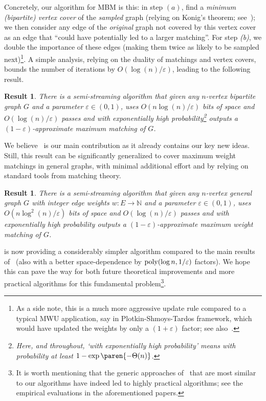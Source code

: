 \documentclass{article}
\newtheorem{result}[theorem]{Result}%
\DeclarePairedDelimiter{\paren}()
\newcommand{\eps}{\varepsilon}
\newcommand{\poly}{\mbox{\rm poly}}
\newcommand{\IN}{\mathbb{N}}
\begin{document}
Concretely, our algorithm for MBM is this: in step $(a)$, find 
a \emph{minimum (bipartite) vertex cover} of the \emph{sampled} graph (relying on Konig's theorem; see~); we then consider any edge of the \emph{original} graph not covered by this vertex cover
as an edge that ``could have potentially led to a larger matching''. For step \emph{(b)}, we double the importance of these edges (making
them twice as likely to be sampled next)\footnote{As a side note, this is a much more aggressive update rule compared to a typical MWU application, say in Plotkin-Shmoys-Tardos framework, which would have updated the weights
 by only a $(1 + \eps)$ factor; see also~.}. A simple analysis, relying on the duality of matchings and vertex covers,  bounds 
the number of iterations by $O(\log{\!(n)}/\eps)$, leading to the following result. 

\begin{result}\label{res:MBM}
\emph{There is a semi-streaming algorithm that given any $n$-vertex bipartite graph $G$ and a parameter $\eps \in (0,1)$, uses $O(n\log{\!(n)}/\eps)$ bits of space and $O(\log{\!(n)}/\eps)$ passes
	and with exponentially high probability\footnote{Here, and throughout, `with exponentially high probability' means with probability at least $1-\exp\paren{-\Theta(n)}$.} outputs a $(1-\eps)$-approximate maximum matching of $G$.} 
\end{result}

We believe~ is our main contribution as it already contains our key new ideas. Still, 
this result can be significantly generalized to cover maximum weight matchings in general graphs, with minimal additional effort and by relying on standard tools from matching theory. 

\begin{result}\label{res:MWM}
\emph{There is a semi-streaming algorithm that given any $n$-vertex general graph $G$ with integer edge weights $w: E \rightarrow \IN$ and a parameter $\eps \in (0,1)$, uses $O(n\log^2{\!(n)}/\eps)$ bits of space and $O(\log{\!(n)}/\eps)$ passes
	and with exponentially high probability outputs a $(1-\eps)$-approximate maximum weight matching of $G$.} 
\end{result}
 is now providing a considerably simpler algorithm compared to the main results of~\cite{AhnG15} (also with a better space-dependence by $\poly{(\log{n},1/\eps)}$ factors). We hope this can pave the way for both future theoretical improvements  
and more practical algorithms for this fundamental problem\footnote{It is worth mentioning that the generic approaches of~\cite{LattanziMSV11,KumarMVV13} that are most similar to our algorithms have 
indeed led to highly practical algorithms; see the empirical evaluations in the aforementioned papers.}. 
\end{document}
